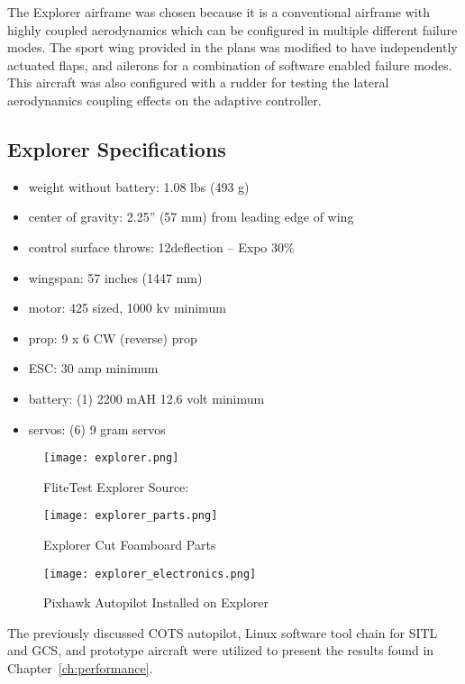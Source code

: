 The Explorer airframe was chosen because it is a conventional airframe with highly coupled aerodynamics which can be configured in multiple different failure modes.  The sport wing provided in the plans was modified to have independently actuated flaps, and ailerons for a combination of software enabled failure modes.  This aircraft was also configured with a rudder for testing the lateral aerodynamics coupling effects on the adaptive controller.  

\subsection{Explorer Specifications}
\begin{itemize}
 \item weight without battery: 1.08 lbs (493 g)
 \item center of gravity: 2.25” (57 mm) from leading edge of wing
 \item control surface throws: 12\degrees  deflection – Expo 30\%
 \item wingspan: 57 inches (1447 mm)
 \item motor: 425 sized, 1000 kv minimum
 \item prop: 9 x 6 CW (reverse) prop
 \item ESC: 30 amp minimum
 \item battery: (1) 2200 mAH 12.6 volt minimum
 \item servos: (6) 9 gram servos 
\end{itemize}

\begin{figure}[!h]
 \centering
  \texttt{[image: explorer.png]}
  \caption{FliteTest Explorer Source:\cite{flitetest}}
  \label{fig:explorer_parts}
\end{figure}

\begin{figure}[!h]
 \centering
  \texttt{[image: explorer\_parts.png]}
  \caption{Explorer Cut Foamboard Parts}
  \label{fig:explorer_parts}
\end{figure}

\begin{figure}[!h]
 \centering
  \texttt{[image: explorer\_electronics.png]}
  \caption{Pixhawk Autopilot Installed on Explorer}
  \label{fig:explorer_electronics}
\end{figure}

The previously discussed \ac{COTS} autopilot, Linux software tool chain for \ac{SITL} and \ac{GCS}, and prototype aircraft were utilized to present the results found in Chapter~\ref{ch:performance}.



